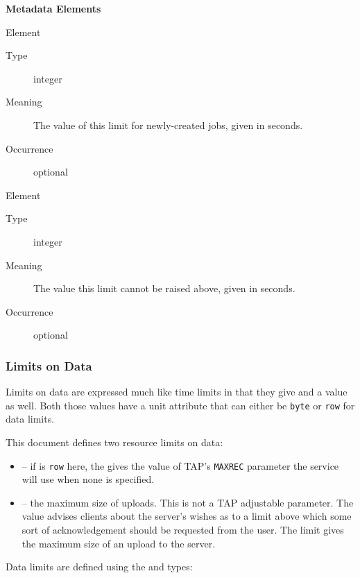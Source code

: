 \documentclass{ivoa}
\begin{document}
\vspace{0.5ex}\noindent\textbf{ Metadata Elements}

\begingroup\small\begin{bigdescription}\item[Element \xmlel{default}]
\begin{description}
\item[Type] integer
\item[Meaning] 
          The value of this limit for newly-created jobs, given in seconds.
          
\item[Occurrence] optional

\end{description}
\item[Element \xmlel{hard}]
\begin{description}
\item[Type] integer
\item[Meaning] 
          The value this limit cannot be raised above, given in seconds.
          
\item[Occurrence] optional

\end{description}


\end{bigdescription}\endgroup

\endgroup

\subsubsection{Limits on Data}
Limits on data are expressed much like time limits in that they give
 and a  value as well.  
Both those values have a unit attribute that can either be \texttt{byte}
or \texttt{row} for data limits.

This document defines two resource limits on data:


\begin{itemize}

\item {} -- if  is \texttt{row} here,
the  gives the
value of TAP's \texttt{MAXREC} parameter the service will use when none
is specified.{}

\item {} -- the maximum size of uploads.  This 
is not a TAP adjustable parameter.  The  value
advises clients about the server's wishes as to a limit above which
some sort of acknowledgement should be requested from the user.  The 
 limit gives the maximum size of an upload to the 
server.{}

\end{itemize}
Data limits are defined using the 
and  types:
\end{document}
